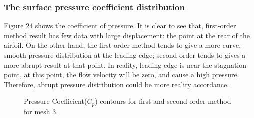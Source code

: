 \documentclass[letterpaper,onecolumn,12pt]{article}
\makeatletter
\newenvironment{figurehere}
  {\def\@captype{figure}}{}
\makeatother
\begin{document}
\begin{figurehere}
 \centering 
  \hspace{.05cm} 
  \caption{Mach contours for first and second-order method for mesh 3.} 
\end{figurehere}

\begin{figurehere}
 \centering 
  \hspace{.05cm} 
  \caption{Pressure contours for first and second-order method for mesh 3.} 
\end{figurehere}

\subsubsection{The surface pressure coefficient distribution}
Figure 24 shows the coefficient of pressure. It is clear to see that, first-order method result has few data with large displacement: the point at the rear of the airfoil. On the other hand, the first-order method tends to give a more curve, smooth pressure distribution at the leading edge; second-order tends to gives a more abrupt result at that point. In reality, leading edge is near the stagnation point, at this point, the flow velocity will be zero, and cause a high pressure. Therefore, abrupt pressure distribution could be more reality accordance.

\begin{figure}
 \centering 
  \hspace{.05cm} 
  \caption{Pressure Coefficient($C_p$) contours for first and second-order method for mesh 3.} 
\end{figure}
\end{document}
